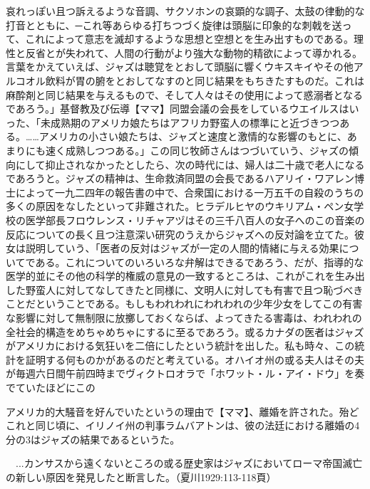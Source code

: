 \begin{gquote}
哀れっぽい且つ訴えるような音調、サクソホンの哀顕的な調子、太鼓の律動的な打音とともに、─これ等あらゆる打ちつづく旋律は頭脳に印象的な刺戟を送って、これによって意志を滅却するような思想と空想とを生み出すものである。理性と反省とが失われて、人間の行動がより強大な動物的精欲によって導かれる。言葉をかえていえば、ジャズは聴覚をとおして頭脳に響くウキスキイやその他アルコオル飲料が胃の腑をとおしてなすのと同じ結果をもちきたすものだ。これは麻酔剤と同じ結果を与えるもので、そして人々はその使用によって惑溺者となるであろう。」基督教及び伝導【ママ】同盟会議の会長をしているウエイルスはいった、「未成熟期のアメリカ娘たちはアフリカ野蛮人の標準にと近づきつつある。……アメリカの小さい娘たちは、ジャズと速度と激情的な影響のもとに、あまりにも速く成熟しつつある。」この同じ牧師さんはつづいていう、ジャズの傾向にして抑止されなかったとしたら、次の時代には、婦人は二十歳で老人になるであろうと。ジャズの精神は、生命救済同盟の会長であるハアリイ・ワアレン博士によって一九二四年の報告書の中で、合衆国における一万五千の自殺のうちの多くの原因をなしたといって非難された。ヒラデルヒヤのウキリアム・ペン女学校の医学部長フロウレンス・リチャアヅはその三千八百人の女子へのこの音楽の反応についての長く且つ注意深い研究のうえからジャズへの反対論を立てた。彼女は説明していう、「医者の反対はジャズが一定の人間的情緒に与える効果についてである。これについてのいろいろな弁解はできるであろう、だが、指導的な医学的並にその他の科学的権威の意見の一致するところは、これがこれを生み出した野蛮人に対してなしてきたと同様に、文明人に対しても有害で且つ恥づべきことだということである。もしもわれわれにわれわれの少年少女をしてこの有害な影響に対して無制限に放擲しておくならば、よってきたる害毒は、われわれの全社会的構造をめちゃめちゃにするに至るであろう。或るカナダの医者はジャズがアメリカにおける気狂いを二倍にしたという統計を出した。私も時々、この統計を証明する何ものかがあるのだと考えている。オハイオ州の或る夫人はその夫が毎週六日間午前四時までヴィクトロオラで「ホワット・ル・アイ・ドウ」を奏でていたほどにこの
\end{gquote}

\begin{gquote}
アメリカ的大騒音を好んでいたというの理由で【ママ】、離婚を許された。殆どこれと同じ頃に、イリノイ州の判事ラムバアトンは、彼の法廷における離婚の4分の3はジャズの結果であるというた。\par{}　...カンサスから遠くないところの或る歴史家はジャズにおいてローマ帝国滅亡の新しい原因を発見したと断言した。（夏川1929:113-118頁）
\end{gquote}

